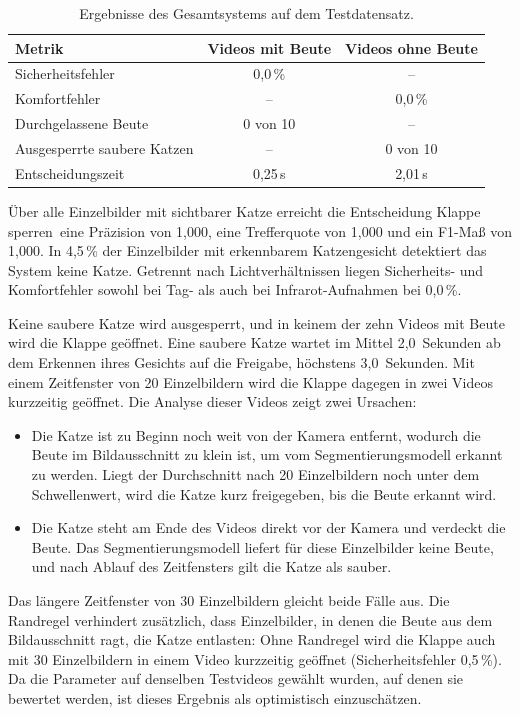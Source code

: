 \begin{table}[H]
    \centering
    \begin{tabular}{lcc}
        \toprule
        Metrik & Videos mit Beute & Videos ohne Beute \\
        \midrule
        Sicherheitsfehler & 0,0\,\% & -- \\
        Komfortfehler & -- & 0,0\,\% \\
        Durchgelassene Beute & 0 von 10 & -- \\
        Ausgesperrte saubere Katzen & -- & 0 von 10 \\
        Entscheidungszeit & 0,25\,s & 2,01\,s \\
        \bottomrule
    \end{tabular}
    \caption{Ergebnisse des Gesamtsystems auf dem Testdatensatz.}
    \label{tab:system_eval}
\end{table}

Über alle Einzelbilder mit sichtbarer Katze erreicht die Entscheidung \glqq Klappe sperren\grqq\ eine Präzision von 1,000, eine Trefferquote von 1,000 und ein F1-Maß von 1,000. In 4,5\,\% der Einzelbilder mit erkennbarem Katzengesicht detektiert das System keine Katze. Getrennt nach Lichtverhältnissen liegen Sicherheits- und Komfortfehler sowohl bei Tag- als auch bei Infrarot-Aufnahmen bei 0,0\,\%.

Keine saubere Katze wird ausgesperrt, und in keinem der zehn Videos mit Beute wird die Klappe geöffnet. Eine saubere Katze wartet im Mittel 2,0~Sekunden ab dem Erkennen ihres Gesichts auf die Freigabe, höchstens 3,0~Sekunden. Mit einem Zeitfenster von 20 Einzelbildern wird die Klappe dagegen in zwei Videos kurzzeitig geöffnet. Die Analyse dieser Videos zeigt zwei Ursachen:

\begin{itemize}
    \item Die Katze ist zu Beginn noch weit von der Kamera entfernt, wodurch die Beute im Bildausschnitt zu klein ist, um vom Segmentierungsmodell erkannt zu werden. Liegt der Durchschnitt nach 20 Einzelbildern noch unter dem Schwellenwert, wird die Katze kurz freigegeben, bis die Beute erkannt wird.
    \item Die Katze steht am Ende des Videos direkt vor der Kamera und verdeckt die Beute. Das Segmentierungsmodell liefert für diese Einzelbilder keine Beute, und nach Ablauf des Zeitfensters gilt die Katze als sauber.
\end{itemize}

Das längere Zeitfenster von 30 Einzelbildern gleicht beide Fälle aus. Die Randregel verhindert zusätzlich, dass Einzelbilder, in denen die Beute aus dem Bildausschnitt ragt, die Katze entlasten: Ohne Randregel wird die Klappe auch mit 30 Einzelbildern in einem Video kurzzeitig geöffnet (Sicherheitsfehler 0,5\,\%). Da die Parameter auf denselben Testvideos gewählt wurden, auf denen sie bewertet werden, ist dieses Ergebnis als optimistisch einzuschätzen.

